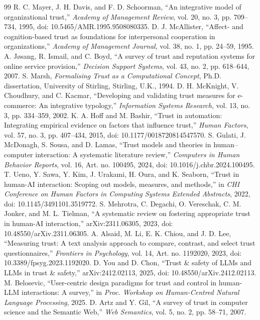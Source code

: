 \documentclass[conference]{IEEEtran}
\begin{document}
\begin{thebibliography}{99}
 R. C. Mayer, J. H. Davis, and F. D. Schoorman, ``An integrative model of organizational trust,'' \textit{Academy of Management Review}, vol. 20, no. 3, pp. 709–734, 1995, doi: 10.5465/AMR.1995.9508080335.
 D. J. McAllister, ``Affect- and cognition-based trust as foundations for interpersonal cooperation in organizations,'' \textit{Academy of Management Journal}, vol. 38, no. 1, pp. 24–59, 1995.
 A. Jøsang, R. Ismail, and C. Boyd, ``A survey of trust and reputation systems for online service provision,'' \textit{Decision Support Systems}, vol. 43, no. 2, pp. 618–644, 2007.
 S. Marsh, \textit{Formalising Trust as a Computational Concept}, Ph.D. dissertation, University of Stirling, Stirling, U.K., 1994.
 D. H. McKnight, V. Choudhury, and C. Kacmar, ``Developing and validating trust measures for e-commerce: An integrative typology,'' \textit{Information Systems Research}, vol. 13, no. 3, pp. 334–359, 2002.
 K. A. Hoff and M. Bashir, ``Trust in automation: Integrating empirical evidence on factors that influence trust,'' \textit{Human Factors}, vol. 57, no. 3, pp. 407–434, 2015, doi: 10.1177/0018720814547570.
 S. Gulati, J. McDonagh, S. Sousa, and D. Lamas, ``Trust models and theories in human–computer interaction: A systematic literature review,'' \textit{Computers in Human Behavior Reports}, vol. 16, Art. no. 100495, 2024, doi: 10.1016/j.chbr.2024.100495.
 T. Ueno, Y. Sawa, Y. Kim, J. Urakami, H. Oura, and K. Seaborn, ``Trust in human-AI interaction: Scoping out models, measures, and methods,'' in \textit{CHI Conference on Human Factors in Computing Systems Extended Abstracts}, 2022, doi: 10.1145/3491101.3519772.
 S. Mehrotra, C. Degachi, O. Vereschak, C. M. Jonker, and M. L. Tielman, ``A systematic review on fostering appropriate trust in human-AI interaction,'' arXiv:2311.06305, 2023, doi: 10.48550/arXiv.2311.06305.
 A. Alsaid, M. Li, E. K. Chiou, and J. D. Lee, ``Measuring trust: A text analysis approach to compare, contrast, and select trust questionnaires,'' \textit{Frontiers in Psychology}, vol. 14, Art. no. 1192020, 2023, doi: 10.3389/fpsyg.2023.1192020.
 D. You and D. Chon, ``Trust \& safety of LLMs and LLMs in trust \& safety,'' arXiv:2412.02113, 2025, doi: 10.48550/arXiv.2412.02113.
 M. Belosevic, ``User-centric design paradigms for trust and control in human-LLM interactions: A survey,'' in \textit{Proc. Workshop on Human-Centred Natural Language Processing}, 2025.
 D. Artz and Y. Gil, ``A survey of trust in computer science and the Semantic Web,'' \textit{Web Semantics}, vol. 5, no. 2, pp. 58–71, 2007.

\end{thebibliography}
\end{document}
